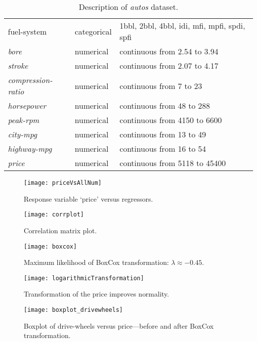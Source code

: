 \begin{sidewaystable}[hbpt]
\begin{tabularx}{\textwidth}{l l X }
fuel-system             &categorical &1bbl, 2bbl, 4bbl, idi, mfi, mpfi, spdi, spfi\\
\emph{bore}                    &numerical &continuous from 2.54 to 3.94\\
\emph{stroke}                  &numerical &continuous from 2.07 to 4.17\\
\emph{compression-ratio}       &numerical &continuous from 7 to 23\\
\emph{horsepower}              &numerical &continuous from 48 to 288\\
\emph{peak-rpm}                &numerical  &continuous from 4150 to 6600\\
\emph{city-mpg}                &numerical & continuous from 13 to 49\\
\emph{highway-mpg}             &numerical &continuous from 16 to 54\\
\emph{price}                   &numerical &continuous from 5118 to 45400\\
\bottomrule
 \end{tabularx}
\caption{Description of \emph{autos} dataset.}
\label{tab:description_autos}
\end{sidewaystable}

\begin{figure}[hbpt]
 \centering
\texttt{[image: priceVsAllNum]}
\caption{Response variable `price' versus regressors.}
\label{fig:priceVsAllNum}
\end{figure}

\begin{figure}[hbpt]
\centering
 \texttt{[image: corrplot]}
\caption{Correlation matrix plot.}
\label{fig:corrplot}
\end{figure}



\begin{figure}[hbpt]
\centering
 \texttt{[image: boxcox]}
\caption{Maximum likelihood of BoxCox transformation: $\lambda \approx -0.45$.}
\label{fig:boxcox}
\end{figure}

\begin{figure}[hbpt]
\centering
 \texttt{[image: logarithmicTransformation]}
\caption{Transformation of the price improves normality.}
\label{fig:logarithmicTransformation}
\end{figure}

\begin{figure}[hbpt]
\centering
 \texttt{[image: boxplot\_drivewheels]}
\caption[Boxplot of drive-wheels versus price]{Boxplot of drive-wheels versus price---before and after BoxCox transformation.}
\label{fig:drivewheelsbox}
\end{figure}






